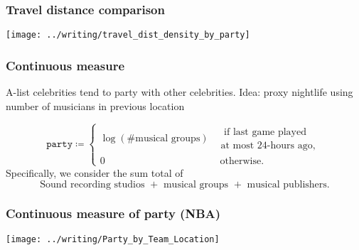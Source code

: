 \documentclass{beamer}
\begin{document}
\begin{frame}   
  \frametitle{Travel distance comparison}
  \centering \texttt{[image: ../writing/travel\_dist\_density\_by\_party]} 
\end{frame}


\begin{frame}   \frametitle{Continuous measure}
  \begin{block}{A-list celebrities tend to party with other celebrities.}     Idea: proxy nightlife using number of musicians in previous location

    \[
      \texttt{party} \coloneqq \begin{cases}       \log \left(\# \textrm{musical groups}\right) &\substack{\textrm{ if last game played} \\ \textrm{at most 24-hours ago,}} \\
      0 &\textrm{ otherwise.}
    \end{cases}
    \]
    \newline
    Specifically, we consider the sum total of
    \[
      \textrm{Sound recording studios } + \textrm{ musical groups } + \textrm{ musical publishers}.
    \]   \end{block} \end{frame}

\begin{frame}   
  \frametitle{Continuous measure of party (NBA)}
  \centering \texttt{[image: ../writing/Party\_by\_Team\_Location]} 
\end{frame}
\end{document}
